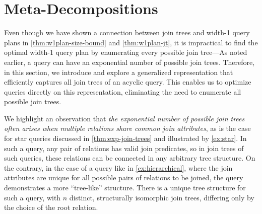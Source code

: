 \section{Meta-Decompositions}
\label{sec:meta}

Even though we have shown a connection between join trees and width-1 query plans in \cref{thm:w1plan-size-bound} and \cref{thm:w1plan-jt}, it is impractical to find the optimal width-1 query plan by enumerating every possible join tree---As noted earlier, a query can have an exponential number of possible join trees. Therefore, in this section, we introduce and explore a generalized representation that efficiently captures all join trees of an acyclic query. This enables us to optimize queries directly on this representation, eliminating the need to enumerate all possible join trees. 

We highlight an observation that \emph{the exponential number of possible join trees often arises when multiple relations share common join attributes}, as is the case for star queries discussed in \cref{thm:exp-join-trees} and illustrated by \cref{ex:star}.
In such a query, any pair of relations has valid join predicates, so in join trees of such queries, these relations can be connected in any arbitrary tree structure.
On the contrary, in the case of a query like in \cref{ex:hierarchical}, where the join attributes are unique for all possible pairs of relations to be joined, the query demonstrates a more ``tree-like'' structure.  There is a unique tree structure for such a query, with $n$ distinct, structurally isomorphic join trees, differing only by the choice of the root relation.

